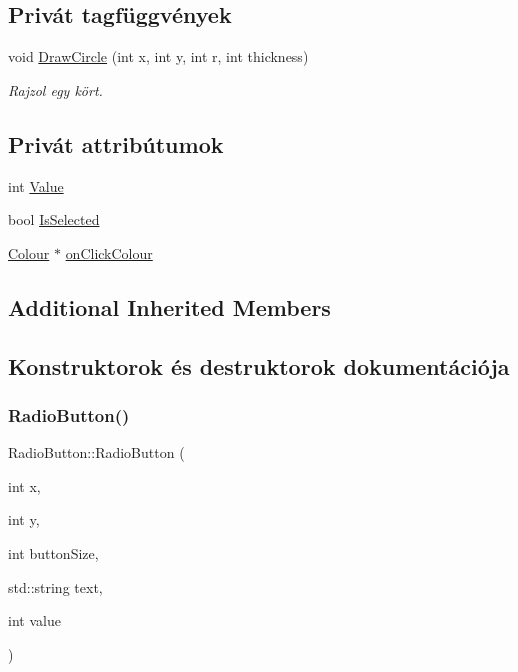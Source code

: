\subsection*{Privát tagfüggvények}
\begin{DoxyCompactItemize}
\item 
void \hyperlink{class_radio_button_afaf4b1617e725b65849d23c057dc3fa7}{Draw\+Circle} (int x, int y, int r, int thickness)
\begin{DoxyCompactList}\small\item\em Rajzol egy kört. \end{DoxyCompactList}\end{DoxyCompactItemize}
\subsection*{Privát attribútumok}
\begin{DoxyCompactItemize}
\item 
int \hyperlink{class_radio_button_a98ca476a4f3f93bdadd03c495b1457c9}{Value}
\item 
bool \hyperlink{class_radio_button_aa3ecd38f7d2f5a9b21d1b0ce9f36ecb0}{Is\+Selected}
\item 
\hyperlink{class_colour}{Colour} $\ast$ \hyperlink{class_radio_button_a944ef6b993774e3c36523915a2bb70bd}{on\+Click\+Colour}
\end{DoxyCompactItemize}
\subsection*{Additional Inherited Members}


\subsection{Konstruktorok és destruktorok dokumentációja}
\mbox{\label{class_radio_button_af4fe7e144ad4ff848bcf4261a359c6e3}} 
\subsubsection{\texorpdfstring{Radio\+Button()}{RadioButton()}}
{\footnotesize\ttfamily Radio\+Button\+::\+Radio\+Button (\begin{DoxyParamCaption}\item[{int}]{x,  }\item[{int}]{y,  }\item[{int}]{button\+Size,  }\item[{std\+::string}]{text,  }\item[{int}]{value }\end{DoxyParamCaption})}



